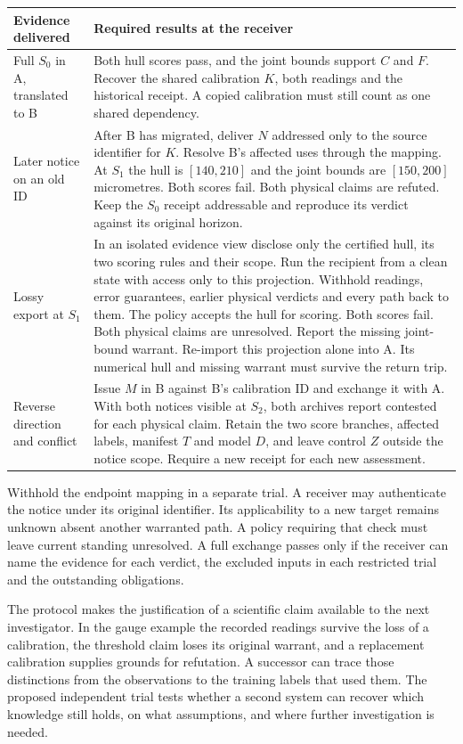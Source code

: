 \documentclass[11pt,a4paper]{article}
\newcommand{\topic}[1]{\par\smallskip{\sffamily\bfseries\color{ink}#1\par}\nobreak}
\begin{document}
\small
\begin{tabularx}{\linewidth}{@{}L{.22\linewidth}Y@{}}
\toprule
\textbf{Evidence delivered} & \textbf{Required results at the receiver} \\ \midrule
Full $S_0$ in A, translated to B & Both hull scores pass, and the joint bounds support $C$ and $F$. Recover the shared calibration $K$, both readings and the historical receipt. A copied calibration must still count as one shared dependency. \\
Later notice on an old ID & After B has migrated, deliver $N$ addressed only to the source identifier for $K$. Resolve B's affected uses through the mapping. At $S_1$ the hull is $[140,210]$ and the joint bounds are $[150,200]$ micrometres. Both scores fail. Both physical claims are refuted. Keep the $S_0$ receipt addressable and reproduce its verdict against its original horizon. \\
Lossy export at $S_1$ & In an isolated evidence view disclose only the certified hull, its two scoring rules and their scope. Run the recipient from a clean state with access only to this projection. Withhold readings, error guarantees, earlier physical verdicts and every path back to them. The policy accepts the hull for scoring. Both scores fail. Both physical claims are unresolved. Report the missing joint-bound warrant. Re-import this projection alone into A. Its numerical hull and missing warrant must survive the return trip. \\
Reverse direction and conflict & Issue $M$ in B against B's calibration ID and exchange it with A. With both notices visible at $S_2$, both archives report contested for each physical claim. Retain the two score branches, affected labels, manifest $T$ and model $D$, and leave control $Z$ outside the notice scope. Require a new receipt for each new assessment. \\
\bottomrule
\end{tabularx}
\normalsize

Withhold the endpoint mapping in a separate trial. A receiver may authenticate the notice under its original identifier. Its applicability to a new target remains unknown absent another warranted path. A policy requiring that check must leave current standing unresolved. A full exchange passes only if the receiver can name the evidence for each verdict, the excluded inputs in each restricted trial and the outstanding obligations.

\topic{Conclusion}
The protocol makes the justification of a scientific claim available to the next investigator. In the gauge example the recorded readings survive the loss of a calibration, the threshold claim loses its original warrant, and a replacement calibration supplies grounds for refutation. A successor can trace those distinctions from the observations to the training labels that used them. The proposed independent trial tests whether a second system can recover which knowledge still holds, on what assumptions, and where further investigation is needed.
\end{document}
